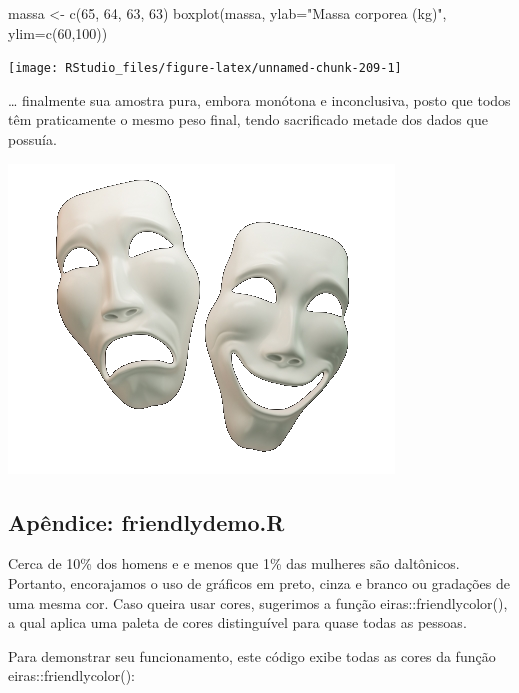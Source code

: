 \documentclass[
]{article}
\newenvironment{Shaded}{\begin{snugshade}}{\end{snugshade}}
\newcommand{\AttributeTok}[1]{\textcolor[rgb]{0.77,0.63,0.00}{#1}}
\newcommand{\DecValTok}[1]{\textcolor[rgb]{0.00,0.00,0.81}{#1}}
\newcommand{\FunctionTok}[1]{\textcolor[rgb]{0.00,0.00,0.00}{#1}}
\newcommand{\NormalTok}[1]{#1}
\newcommand{\OtherTok}[1]{\textcolor[rgb]{0.56,0.35,0.01}{#1}}
\newcommand{\StringTok}[1]{\textcolor[rgb]{0.31,0.60,0.02}{#1}}
\begin{document}
\begin{Shaded}
\begin{Highlighting}[]
\NormalTok{massa }\OtherTok{\textless{}{-}} \FunctionTok{c}\NormalTok{(}\DecValTok{65}\NormalTok{, }\DecValTok{64}\NormalTok{, }\DecValTok{63}\NormalTok{, }\DecValTok{63}\NormalTok{)}
\FunctionTok{boxplot}\NormalTok{(massa, }\AttributeTok{ylab=}\StringTok{"Massa corporea (kg)"}\NormalTok{, }\AttributeTok{ylim=}\FunctionTok{c}\NormalTok{(}\DecValTok{60}\NormalTok{,}\DecValTok{100}\NormalTok{))}
\end{Highlighting}
\end{Shaded}

\begin{center}\texttt{[image: RStudio\_files/figure-latex/unnamed-chunk-209-1]} \end{center}

\ldots{} finalmente sua amostra pura, embora monótona e inconclusiva,
posto que todos têm praticamente o mesmo peso final, tendo sacrificado
metade dos dados que possuía.

\begin{center}\includegraphics[width=0.3\linewidth]{tragicomico} \end{center}

\hypertarget{apuxeandice-friendlydemo.r}{%
\subsection{Apêndice: friendlydemo.R}\label{apuxeandice-friendlydemo.r}}

Cerca de 10\% dos homens e e menos que 1\% das mulheres são daltônicos.
Portanto, encorajamos o uso de gráficos em preto, cinza e branco ou
gradações de uma mesma cor. Caso queira usar cores, sugerimos a função
eiras::friendlycolor(), a qual aplica uma paleta de cores distinguível
para quase todas as pessoas.

Para demonstrar seu funcionamento, este código exibe todas as cores da
função eiras::friendlycolor():
\end{document}
